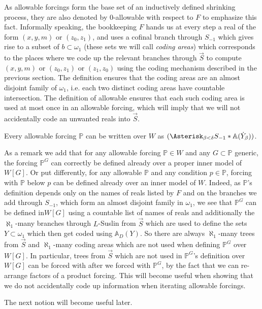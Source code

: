 \documentclass[a4paper,11pt]{article}
\newcommand{\forceP}{\mathbb{P}}
\begin{document}
As allowable forcings form the base set of an inductively defined shrinking process, they are also denoted by 0-allowable with respect to $F$ to emphasize this fact.
Informally speaking, the bookkeeping $F$ hands us at every step a real of the form $(x,y,m)$ or $(z_0,z_1)$, and uses a cofinal branch through $S_{-1}$ which gives rise to a subset of $b \subset \omega_1$ (these sets we will call \emph{coding areas}) which corresponds to the places where we code up the relevant branches through $\vec{S}$ to compute $(x,y,m)$ or $(z_0,z_1)$ or $(z_1,z_0)$ using the coding mechanism described in the previous section. The definition ensures that the coding areas are an almost disjoint family of $\omega_1$, i.e. each two distinct coding areas have countable intersection. The definition of allowable ensures that each such coding area is used at most once in an allowable forcing, which will imply that we will not accidentally code an unwanted reals into $\vec{S}$. 

Every allowable forcing $\forceP$ can be written over $W$ as $ (\Asterisk_{\beta<\delta} S_{-1} \ast \mathbb{A} (\dot{Y}_{\beta}))$.


As a remark we add that for any allowable forcing $\forceP \in W$ and any $G \subset \forceP$ generic, the forcing $\forceP^G$ can correctly  be defined already over a proper inner model of  $W[G]$. Or put differently, for any allowable $\forceP$ and any condition $p \in \forceP$, forcing with $\forceP$ below $p$ can be defined already over an inner model of $W$.  Indeed, as $\forceP$'s definition depends only on the names of reals listed by $F$ and on the branches we add through $S_{-1}$, which form an almost disjoint family in $\omega_1$, we see that $\forceP^G$ can be defined in$W[G]$ using a countable list of names of reals and additionally the $\aleph_1$-many branches through $L$-Suslin from $\vec{S}$ which are used to define the sets $Y \subset \omega_1$ which then get coded using $\mathbb{A}_D (Y)$.
So  there are always $\aleph_1$-many trees from $\vec{S}$ and $\aleph_1$-many coding areas which are not used when defining $\forceP^G$ over $W[G]$. In particular, trees from $\vec{S}$ which are not used in $\forceP^G$'s definition over $W[G]$ can be forced with after we forced with $\forceP^G$, by the fact that we can re-arrange factors of a product forcing. This will become useful when showing that we do not accidentally code up information when iterating allowable forcings.

The next notion will become useful later.
\end{document}
